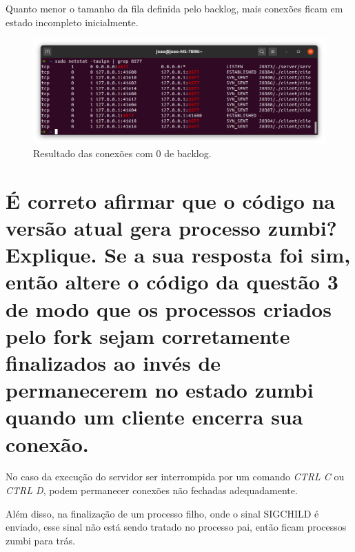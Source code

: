\documentclass[12pt,a4paper]{report}
\begin{document}
Quanto menor o tamanho da fila definida pelo backlog, mais conexões ficam em estado incompleto inicialmente.

\begin{figure}[H]
  \includegraphics[width=\linewidth]{0back.png}
  \caption{Resultado das conexões com 0 de backlog.}
\end{figure}

\section{É correto afirmar que o código na versão atual gera processo zumbi? Explique. Se a
sua resposta foi sim, então altere o código da questão 3 de modo que os processos
criados pelo fork sejam corretamente finalizados ao invés de permanecerem no estado
zumbi quando um cliente encerra sua conexão.}
No caso da execução do servidor ser interrompida por um comando \emph{CTRL C} ou \emph{CTRL D}, podem permanecer conexões não fechadas adequadamente.

Além disso, na finalização de um processo filho, onde o sinal SIGCHILD é enviado, esse sinal não está sendo tratado no processo pai, então ficam processos zumbi para trás.




\end{document}
